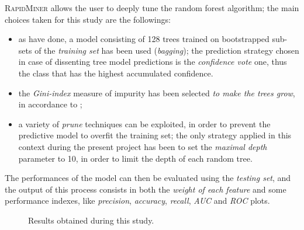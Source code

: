 \documentclass[a4paper]{article}
\begin{document}
	 		\textsc{RapidMiner} allows the user to deeply tune the random forest algorithm; the main choices taken for this study are the followings:
	 		\begin{itemize}
	 			\item as \citeauthor{article:muller} have done, a model consisting of 128 trees trained on bootstrapped sub-sets of the \emph{training set} has been used (\emph{bagging}); the prediction strategy chosen in case of dissenting tree model predictions is the \emph{confidence vote} one, thus the class that has the highest accumulated confidence.
	 			\item the \emph{Gini-index} measure of impurity has been selected \emph{to make the trees grow}, in accordance to \citeauthor{article:muller};
	 			\item a variety of \emph{prune} techniques can be exploited, in order to prevent the predictive model to overfit the training set; the only strategy applied in this context during the present project has been to set the \emph{maximal depth} parameter to 10, in order to limit the depth of each random tree.
	 		\end{itemize}
 		
			The performances of the model can then be evaluated using the \emph{testing set}, and the output of this process consists in both the \emph{weight of each feature} and some performance indexes, like \emph{precision}, \emph{accuracy}, \emph{recall}, \emph{AUC} and \emph{ROC} plots.		
			
		\begin{figure}[p]
			\centering
			\quad
			\caption{Results obtained during this study.}
			\label{fig:muller_results}
		\end{figure}
		
\end{document}

